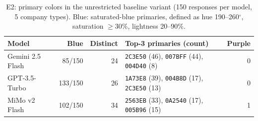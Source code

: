 \begin{table}[t]
\centering
\small
\caption{E2: primary colors in the unrestricted baseline variant (150 responses per model, 5 company types). Blue: saturated-blue primaries, defined as hue 190--260$^\circ$, saturation $\geq$30\%, lightness 20--90\%.}
\label{tab:study2-palette}
\begin{tabular}{lrrlr}
\toprule
Model & Blue & Distinct & Top-3 primaries (count) & Purple \\
\midrule
Gemini 2.5 Flash & 85/150 & 24 & \texttt{2C3E50} (46), \texttt{007BFF} (44), \texttt{004D40} (8) & 0 \\
GPT-3.5-Turbo & 133/150 & 26 & \texttt{1A73E8} (39), \texttt{004B8D} (17), \texttt{2C3E50} (13) & 0 \\
MiMo v2 Flash & 102/150 & 34 & \texttt{2563EB} (33), \texttt{0A2540} (17), \texttt{005B96} (15) & 1 \\
\bottomrule
\end{tabular}
\end{table}
